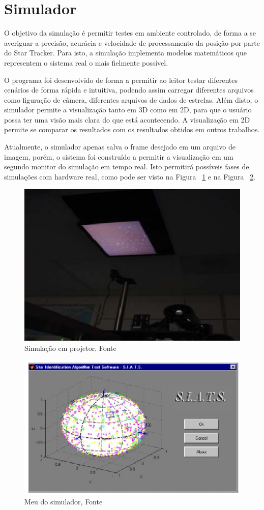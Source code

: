 \section{Simulador}
\label{cap:simulador}

O objetivo da simulação é permitir testes em ambiente controlado, 
de forma a se averiguar a precisão, acurácia e velocidade de processamento da posição por parte do Star Tracker. 
Para isto, a simulação implementa modelos matemáticos que representem o sistema real o mais fielmente possível. 

O programa foi desenvolvido de forma a permitir ao leitor testar diferentes cenários de forma rápida e intuitiva,
podendo assim carregar diferentes arquivos como figuração de câmera, diferentes arquivos de dados de estrelas. 
Além disto, o simulador permite a visualização tanto em 3D como em 2D, para que o usuário possa ter uma visão mais clara do que está acontecendo.
A visualização em 2D permite se comparar os resultados com os resultados obtidos em outros trabalhos.

Atualmente, o simulador apenas salva o frame desejado em um arquivo de imagem, porém, o sistema foi construído a permitir a visualização em um segundo monitor do simulação em tempo real.
Isto permitirá possíveis fases de simulações com hardware real, como pode ser visto na Figura ~\ref{fig:Simulador_top} e na Figura ~\ref{fig:Simulador_tipo_meu}.

\begin{figure}[H]
    \centering
    \includegraphics[width=.65\columnwidth]{images/Simulador_top.png}
    \caption{Simulação em projetor, Fonte ~\cite[]{Tappe}}
    \label{fig:Simulador_top}
\end{figure}

\begin{figure}[H]
    \centering
    \includegraphics[width=.65\columnwidth]{images/Simulador_tipo_meu.png}
    \caption{Meu do simulador, Fonte ~\cite[]{Carvalho}}
    \label{fig:Simulador_tipo_meu}
\end{figure}

